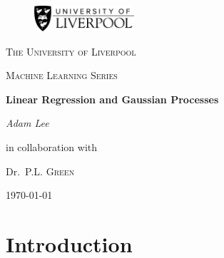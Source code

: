 \documentclass[10pt,a4paper]{article}
\author{Adam Lee}
\numberwithin{equation}{section}
\theoremstyle{plain}
\theoremstyle{definition}
\theoremstyle{own}
\begin{document}
\begin{titlepage}
\begin{figure}[h!]
\includegraphics[width=10em]{logo}
\end{figure}
\begin{center}
\vspace{10mm}
	{\scshape\LARGE The University of Liverpool \par}
	\vspace{1cm}
	{\scshape\Large Machine Learning Series \par}
	\vspace{1.5cm}
	{\huge\bfseries Linear Regression and Gaussian Processes\par}
	\vspace{2cm}
	{\Large\itshape Adam Lee\par}
	\vfill
	in collaboration with \par
	Dr.~P.L. \textsc{Green}

	\vfill


	{\large \today\par}
\end{center}
\end{titlepage}
\newpage
\tableofcontents
\pagebreak
\section*{Introduction} \label{sec:intro} 
\end{document}
